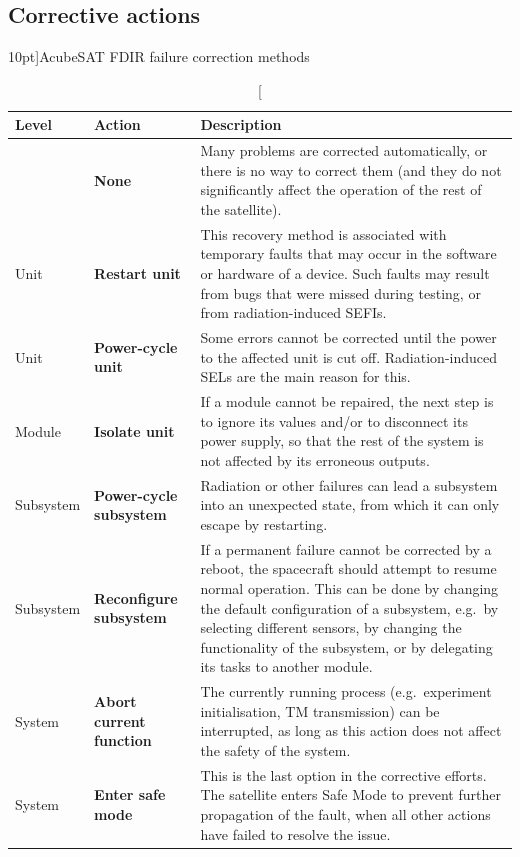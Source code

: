 \documentclass[a4paper,nobib,final]{tufte-book}
\begin{document}
\clearpage
\subsection{Corrective actions}

\begin{table}[h]
	\centering
	\caption[][10pt]{AcubeSAT \acs{FDIR} failure correction methods}
	\label{tab:fdir_correction}
	\renewcommand{\arraystretch}{1.5}
	\begin{tabularx}{\textwidth}{@{}lL{3cm}X@{}}
		\toprule
		Level & Action & Description \\ \midrule
		& \textbf{None} & Many problems are corrected automatically, or there is no way to correct them (and they do not significantly affect the operation of the rest of the satellite). \\
		Unit & \textbf{Restart unit} & This recovery method is associated with temporary faults that may occur in the software or hardware of a device. Such faults may result from bugs that were missed during testing, or from radiation-induced \acsp{SEFI}. \\
		Unit & \textbf{Power-cycle unit} & Some errors cannot be corrected until the power to the affected unit is cut off. Radiation-induced \acsp{SEL} are the main reason for this. \\
		Module & \textbf{Isolate unit} & If a module cannot be repaired, the next step is to ignore its values and/or to disconnect its power supply, so that the rest of the system is not affected by its erroneous outputs. \\
		Subsystem & \textbf{Power-cycle subsystem} & Radiation or other failures can lead a subsystem into an unexpected state, from which it can only escape by restarting. \\
		Subsystem & \textbf{Reconfigure subsystem} & If a permanent failure cannot be corrected by a reboot, the spacecraft should attempt to resume normal operation. This can be done by changing the default configuration of a subsystem, e.g.\ by selecting different sensors, by changing the functionality of the subsystem, or by delegating its tasks to another module. \\
		System & \textbf{Abort current function} & The currently running process (e.g.\ experiment initialisation, \acs{TM} transmission) can be interrupted, as long as this action does not affect the safety of the system. \\
		System & \textbf{Enter safe mode} & This is the last option in the corrective efforts. The satellite enters Safe Mode to prevent further propagation of the fault, when all other actions have failed to resolve the issue. \\ \bottomrule
	\end{tabularx}
\end{table}
\end{document}
